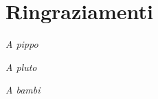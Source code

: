 
\chapter*{Ringraziamenti}
\vspace{3.3cm}
\begin{flushright}
\textit{A pippo} 
\end{flushright}

\begin{flushright}
\indent\textit{A pluto}
\end{flushright}

\begin{flushright}
\indent\textit{A bambi}
\end{flushright}
